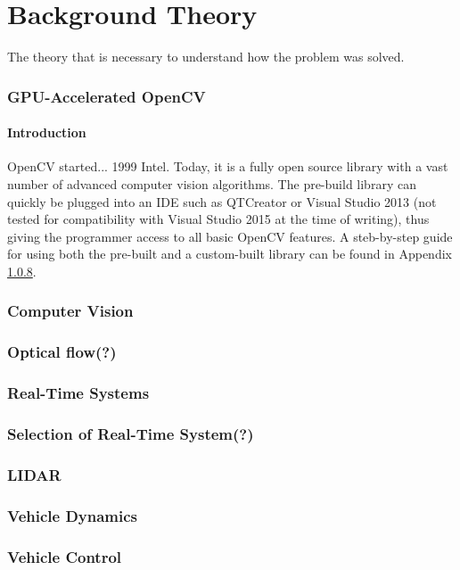 \chapter{Background Theory}

The theory that is necessary to understand how the problem was solved.

\subsection{GPU-Accelerated OpenCV}

\subsubsection{Introduction}

OpenCV started... 1999 Intel. Today, it is a fully open source library with a vast number of advanced computer vision algorithms. The pre-build library can quickly be plugged into  an IDE such as QTCreator or Visual Studio 2013 (not tested for compatibility with Visual Studio 2015 at the time of writing), thus giving the programmer access to all basic OpenCV features. A steb-by-step guide for using both the pre-built and a custom-built library can be found in Appendix \ref{}.

\subsection{Computer Vision}

\subsection{Optical flow(?)}

\subsection{Real-Time Systems}

\subsection{Selection of Real-Time System(?)}

\subsection{LIDAR}

\subsection{Vehicle Dynamics}

\subsection{Vehicle Control}

